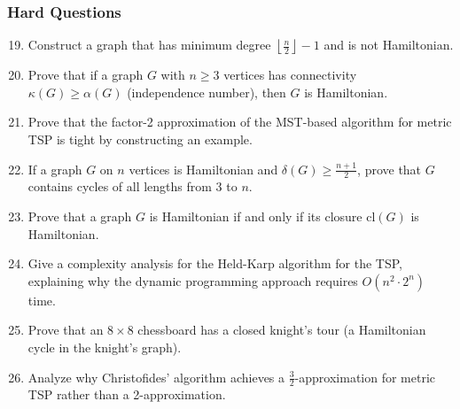 \documentclass{article}
\theoremstyle{definition}
\begin{document}
\subsubsection{Hard Questions}
\begin{enumerate}\setcounter{enumi}{18}
\item Construct a graph that has minimum degree $\left\lfloor\frac{n}{2}\right\rfloor - 1$ and is not Hamiltonian.

\item Prove that if a graph $G$ with $n \geq 3$ vertices has connectivity $\kappa(G) \geq \alpha(G)$ (independence number), then $G$ is Hamiltonian.

\item Prove that the factor-2 approximation of the MST-based algorithm for metric TSP is tight by constructing an example.

\item If a graph $G$ on $n$ vertices is Hamiltonian and $\delta(G) \geq \frac{n+1}{2}$, prove that $G$ contains cycles of all lengths from 3 to $n$.

\item Prove that a graph $G$ is Hamiltonian if and only if its closure $\text{cl}(G)$ is Hamiltonian.

\item Give a complexity analysis for the Held-Karp algorithm for the TSP, explaining why the dynamic programming approach requires $O(n^2 \cdot 2^n)$ time.

\item Prove that an $8 \times 8$ chessboard has a closed knight's tour (a Hamiltonian cycle in the knight's graph).

\item Analyze why Christofides' algorithm achieves a $\frac{3}{2}$-approximation for metric TSP rather than a 2-approximation.
\end{enumerate}
\end{document}
